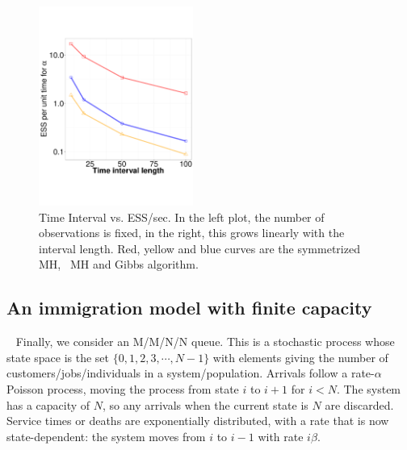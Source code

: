 {\begin{figure}
\begin{minipage}[!hp]{0.73\linewidth}
  \centering
    \includegraphics [width=0.45\textwidth, angle=0]{figs/ESS_vs_t_alpha_fixobservation_JC.pdf}
  \end{minipage}
  \begin{minipage}[!hp]{0.25\linewidth}
  \vspace{-.4in}
    \caption{Time Interval vs. ESS/sec. In the left plot, the number of 
    observations is fixed, in the right, this grows linearly with the
  interval length. Red, yellow and blue curves are the symmetrized MH,
  \naive\ MH and Gibbs algorithm. }
	\label{fig:jc_model_vs_t}
  \end{minipage}
  \end{figure}


\subsection{An immigration model with finite capacity}\label{sec:immig}~
Finally, we consider an M/M/N/N queue. This is a stochastic 
process whose state space is the set $\{0, 1, 2, 3, \cdots, N - 1\}$ with 
elements giving the number of customers/jobs/individuals in a system/population. 
Arrivals follow a rate-$\alpha$ Poisson process, moving the process from state 
$i$ to $i+1$ for $i<N$. The system has a capacity of $N$, so any arrivals when 
the current state is $N$ are discarded.  Service times or deaths are 
exponentially distributed, with a rate that is now state-dependent:
the system moves from $i$ to $i - 1$ with rate $i\beta$. 

}
